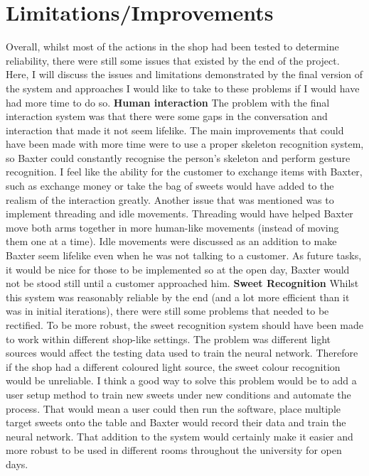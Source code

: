 \section{Limitations/Improvements}
Overall, whilst most of the actions in the shop had been tested to determine reliability, there were still some issues that existed by the end of the project. Here, I will discuss the issues and limitations demonstrated by the final version of the system and approaches I would like to take to these problems if I would have had more time to do so.\newline\newline
\textbf{Human interaction}\newline
The problem with the final interaction system was that there were some gaps in the conversation and interaction that made it not seem lifelike. The main improvements that could have been made with more time were to use a proper skeleton recognition system, so Baxter could constantly recognise the person's skeleton and perform gesture recognition. I feel like the ability for the customer to exchange items with Baxter, such as exchange money or take the bag of sweets would have added to the realism of the interaction greatly. Another issue that was mentioned was to implement threading and idle movements. Threading would have helped Baxter move both arms together in more human-like movements (instead of moving them one at a time). Idle movements were discussed as an addition to make Baxter seem lifelike even when he was not talking to a customer. As future tasks, it would be nice for those to be implemented so at the open day, Baxter would not be stood still until a customer approached him.
\newline\newline
\textbf{Sweet Recognition}\newline
Whilst this system was reasonably reliable by the end (and a lot more efficient than it was in initial iterations), there were still some problems that needed to be rectified. To be more robust, the sweet recognition system should have been made to work within different shop-like settings. The problem was different light sources would affect the testing data used to train the neural network. Therefore if the shop had a different coloured light source, the sweet colour recognition would be unreliable. I think a good way to solve this problem would be to add a user setup method to train new sweets under new conditions and automate the process. That would mean a user could then run the software, place multiple target sweets onto the table and Baxter would record their data and train the neural network. That addition to the system would certainly make it easier and more robust to be used in different rooms throughout the university for open days.\newline\newline
